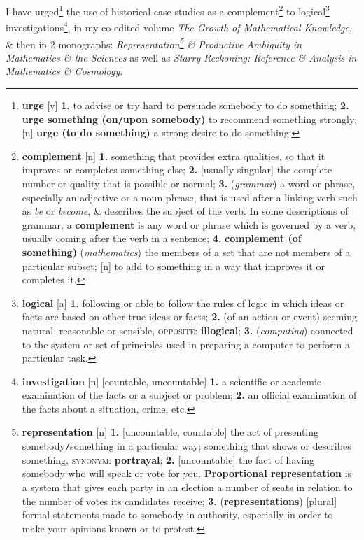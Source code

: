 \documentclass[oneside]{book}
\numberwithin{equation}{section}
\begin{document}
I have urged\footnote{\textbf{urge} [v] \textbf{1.} to advise or try hard to persuade somebody to do something; \textbf{2.} \textbf{urge something (on\texttt{/}upon somebody)} to recommend something strongly; [n] \textbf{urge (to do something)} a strong desire to do something.} the use of historical case studies as a complement\footnote{\textbf{complement} [n] \textbf{1.} something that provides extra qualities, so that it improves or completes something else; \textbf{2.} [usually singular] the complete number or quality that is possible or normal; \textbf{3.} (\textit{grammar}) a word or phrase, especially an adjective or a noun phrase, that is used after a linking verb such as \textit{be} or \textit{become}, \& describes the subject of the verb. In some descriptions of grammar, a \textbf{complement} is any word or phrase which is governed by a verb, usually coming after the verb in a sentence; \textbf{4.} \textbf{complement (of something)} (\textit{mathematics}) the members of a set that are not members of a particular subset; [n] to add to something in a way that improves it or completes it.} to logical\footnote{\textbf{logical} [a] \textbf{1.} following or able to follow the rules of logic in which ideas or facts are based on other true ideas or facts; \textbf{2.} (of an action or event) seeming natural, reasonable or sensible, \textsc{opposite}: \textbf{illogical}; \textbf{3.} (\textit{computing}) connected to the system or set of principles used in preparing a computer to perform a particular task.} investigations\footnote{\textbf{investigation} [n] [countable, uncountable] \textbf{1.} a scientific or academic examination of the facts or a subject or problem; \textbf{2.} an official examination of the facts about a situation, crime, etc.}, in my co-edited volume \textit{The Growth of Mathematical Knowledge}, \& then in 2 monographs: \textit{Representation\footnote{\textbf{representation} [n] \textbf{1.} [uncountable, countable] the act of presenting somebody\texttt{/}something in a particular way; something that shows or describes something, \textsc{synonym}: \textbf{portrayal}; \textbf{2.} [uncountable] the fact of having somebody who will speak or vote for you. \textbf{Proportional representation} is a system that gives each party in an election a number of seats in relation to the number of votes its candidates receive; \textbf{3.} (\textbf{representations}) [plural] formal statements made to somebody in authority, especially in order to make your opinions known or to protest.} \& Productive Ambiguity in Mathematics \& the Sciences} as well as \textit{Starry Reckoning: Reference \& Analysis in Mathematics \& Cosmology}.
\end{document}
